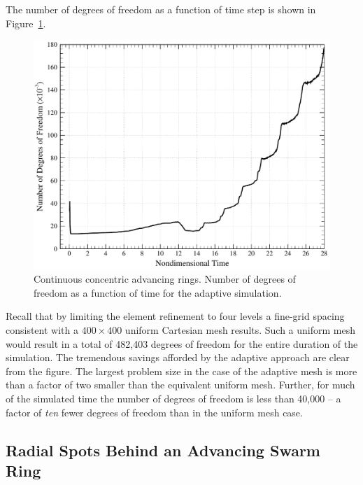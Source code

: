 The number of degrees of freedom as a function of time step is shown in Figure~\ref{fig:bio_concentric_rings_amr_dofs}.
\begin{figure}
  \includegraphics[width=\textwidth]{figures/bio_concentric_rings/dofs}
  \caption{Continuous concentric advancing rings. Number of degrees of freedom as a function of time for the adaptive simulation.\label{fig:bio_concentric_rings_amr_dofs}}
\end{figure}
Recall that by limiting the element refinement to four levels a fine-grid spacing consistent with a $400 \times 400$ uniform Cartesian mesh results.  Such a uniform mesh would result in a total of 482,403 degrees of freedom for the entire duration of the simulation.  The tremendous savings afforded by the adaptive approach are clear from the figure.  The largest problem size in the case of the adaptive mesh is more than a factor of two smaller than the equivalent uniform mesh.  Further, for much of the simulated time the number of degrees of freedom is less than 40,000 -- a factor of \emph{ten} fewer degrees of freedom than in the uniform mesh case.



\subsection{Radial Spots Behind an Advancing Swarm Ring\label{sect:radial_spots}}

